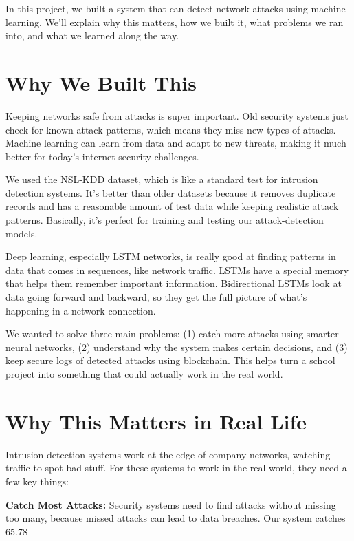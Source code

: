 \documentclass[12pt,a4paper]{report}
\begin{document}
In this project, we built a system that can detect network attacks using machine learning. We'll explain why this matters, how we built it, what problems we ran into, and what we learned along the way.

\section{Why We Built This}

Keeping networks safe from attacks is super important. Old security systems just check for known attack patterns, which means they miss new types of attacks. Machine learning can learn from data and adapt to new threats, making it much better for today's internet security challenges.

We used the NSL-KDD dataset, which is like a standard test for intrusion detection systems. It's better than older datasets because it removes duplicate records and has a reasonable amount of test data while keeping realistic attack patterns. Basically, it's perfect for training and testing our attack-detection models.

Deep learning, especially LSTM networks, is really good at finding patterns in data that comes in sequences, like network traffic. LSTMs have a special memory that helps them remember important information. Bidirectional LSTMs look at data going forward and backward, so they get the full picture of what's happening in a network connection.

We wanted to solve three main problems: (1) catch more attacks using smarter neural networks, (2) understand why the system makes certain decisions, and (3) keep secure logs of detected attacks using blockchain. This helps turn a school project into something that could actually work in the real world.

\section{Why This Matters in Real Life}

Intrusion detection systems work at the edge of company networks, watching traffic to spot bad stuff. For these systems to work in the real world, they need a few key things:

\textbf{Catch Most Attacks:} Security systems need to find attacks without missing too many, because missed attacks can lead to data breaches. Our system catches 65.78%
\end{document}
